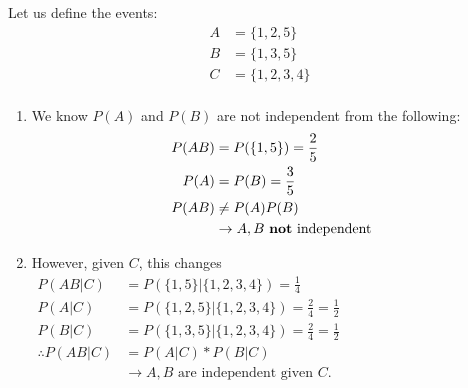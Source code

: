 \documentclass[10pt]{article}
\begin{document}
\begin{flushleft}
\begin{itemize}
            Let us define the events:
        $$ \begin{aligned}
            A &= \{1, 2, 5\} \\
            B &= \{1, 3, 5\} \\
            C &= \{1, 2, 3, 4\} \\
        \end{aligned} $$
        \begin{enumerate}
            \item We know $P(A)$ and $P(B)$ are not independent from the
                following: $$ \begin{aligned}
                    P(AB) &= P(\{1, 5\}) = \frac{2}{5} \\
                    P(A) &= P(B) = \frac{3}{5} \\
                    P(AB) &\neq P(A)P(B) \\
                          &\rightarrow A, B \text{ \textbf{not} independent}
                \end{aligned} $$
            \item However, given $C$, this changes $ \begin{aligned}
                    P(AB|C) &= P(\{1,5\}|\{1,2,3,4\}) = \frac{1}{4} \\
                    P(A|C) &= P(\{1,2,5\}|\{1,2,3,4\}) = \frac{2}{4} =
                    \frac{1}{2} \\
                    P(B|C) &= P(\{1,3,5\}|\{1,2,3,4\}) = \frac{2}{4} =
                    \frac{1}{2} \\
                    \therefore P(AB|C) &= P(A|C) * P(B|C) \\
                                       &\rightarrow A, B \text{ are independent
                                       given }
                                       C.
                \end{aligned} $
        \end{enumerate}
\end{itemize}

\end{flushleft}
\end{document}
